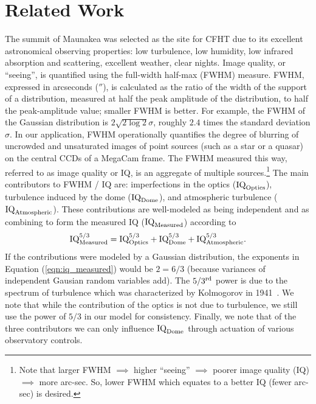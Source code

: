 \section{Related Work}\label{sec:relatedWork}

The summit of Maunakea was selected as the site for CFHT due to its excellent astronomical observing properties: low turbulence, low humidity, low infrared absorption and scattering, excellent weather,  clear nights.  Image quality, or ``seeing'', is quantified using the full-width half-max (FWHM) measure. FWHM, expressed in arcseconds ($''$), is calculated as the ratio of the width of the support of a distribution, measured at half the peak amplitude of the distribution, to  half the peak-amplitude value; smaller FWHM is better.  For example, the FWHM  of the Gaussian distribution is $2 \sqrt{2 \log 2} \sigma$, roughly $2.4$ times the standard deviation $\sigma$.  In our application, FWHM operationally quantifies the degree of blurring of uncrowded and unsaturated images of point sources (such as a star or a quasar) on the central CCDs of a MegaCam frame. %
The FWHM measured this way, referred to as image quality or IQ, is an aggregate of multiple sources.\footnote{Note that larger FWHM $\implies$ higher ``seeing'' $\implies$ poorer image quality (IQ) $\implies$ more arc-sec.  So, lower FWHM which equates to a better IQ (fewer arc-sec) is desired.} The main contributors to FWHM / IQ are: imperfections in the optics ($\textrm{IQ}_{\textrm{Optics}}$), turbulence induced by the dome ($\textrm{IQ}_{\textrm{Dome}}$), and  atmospheric turbulence ($\textrm{IQ}_{\textrm{Atmospheric}}$). These contributions are well-modeled as being independent and as combining to form the measured IQ ($\textrm{IQ}_{\textrm{Measured}}$) according to
\begin{align}
\textrm{IQ}_{\textrm{Measured}}^{5/3} =  \textrm{IQ}_{\textrm{Optics}}^{5/3} + \textrm{IQ}_{\textrm{Dome}}^{5/3} + \textrm{IQ}_{\textrm{Atmospheric}}^{5/3}.
\label{eqn:iq_measured}
\end{align}
If the contributions were modeled by a Gaussian distribution, the exponents in Equation (\ref{eqn:iq_measured}) would be $2 = 6/3$ (because variances of independent Gausian random variables add).  The $5/3^{\rm rd}$ power is due to the spectrum of turbulence which was characterized by Kolmogorov in 1941~\citep{tartarskii}.  We note that while the contribution of the optics is not due to turbulence, we still use the power of $5/3$ in our model for consistency. Finally, we note that of the three contributors we can only influence $\textrm{IQ}_{\textrm{Dome}}$ through actuation of various observatory controls.
    

